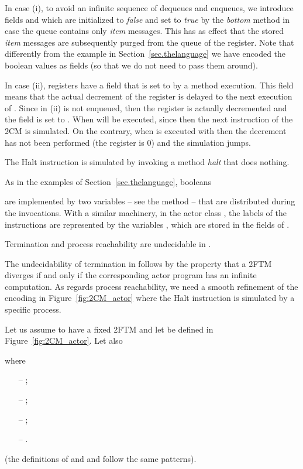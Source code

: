 \documentclass{LMCS}
\theoremstyle{plain}\newtheorem{proposition}[thm]{Proposition}
\theoremstyle{plain}\newtheorem{lemma}[thm]{Lemma}
\theoremstyle{plain}\newtheorem{theorem}[thm]{Theorem}
\theoremstyle{plain}\newtheorem{corollary}[thm]{Corollary}
\newif\ifconf \conffalse
\newcommand{\actba}{}
\begin{document}
In case (i), to avoid an infinite sequence of  dequeues and 
enqueues, we introduce fields  and  which are  initialized to {\it false} and set to {\it true}
by the {\it bottom} method in case the queue contains only {\it item} messages.
This has as effect that the stored {\it item} messages are subsequently purged from the queue of the register. 
Note that differently from the example in Section~\ref{sec.thelanguage} we have encoded the boolean values
as fields (so that we do not need to pass them around).



In case (ii), registers have a field   that is set to  by 
a  method execution. This field means that the actual decrement
of the register is delayed to the next execution of . Since in 
(ii)  is not enqueued, then the register is actually decremented and
the field   is set to . When 
 will be executed, since 
  then the next instruction of the 2CM is simulated.
On the contrary, when   is executed with 
then the decrement has not been performed (the register is 0) and the simulation 
jumps.

The {\sf Halt} instruction is simulated by invoking a method {\it halt} that does nothing.

\ifconf
Booleans
\else
As in the examples of Section~\ref{sec.thelanguage}, booleans
\fi
are implemented by two variables 
-- see the method  -- that are distributed during the invocations. 
With a similar machinery, in the actor class ,   the
labels of the instructions are represented 
by the variables , 
which are stored in the fields  of .

\begin{thm}
\label{thm.undecidablestatefull}
Termination and process reachability 
are undecidable in {\actba}.
\end{thm}
The undecidability of termination in {\actba} follows by the
property that a 2FTM  diverges if and only if the corresponding actor program
has an infinite computation. As regards process reachability, we need a smooth
refinement of the encoding in Figure~\ref{fig:2CM_actor} where the {\sf Halt}
instruction is simulated by a specific process. 


\ifconf
\else
\proof
Let us assume to have a fixed 2FTM and let  be defined in Figure~\ref{fig:2CM_actor}. 
Let also

where 
\begin{itemize}
\item[--] 
;

\item[--] 
;

\item[--] 
;

\item[--]
.
\end{itemize}
(the definitions of  and 
 and 
follow the same patterns).
\end{document}
